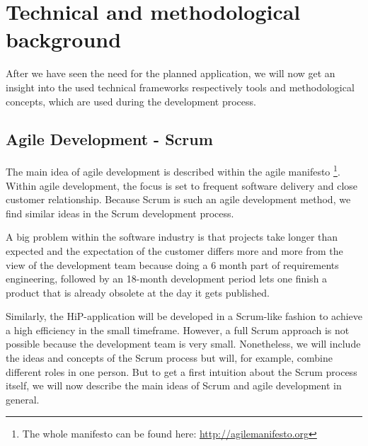 \chapter[Technical and methodological background]{Technical and methodological background}
\label{background}
After we have seen the need for the planned application, we will now get an insight into the used technical frameworks respectively tools and methodological concepts, which are used during the development process.  

\section{Agile Development - Scrum}
\label{SCRUM-intro}
The main idea of agile development is described within the agile manifesto \cite{Beck2001agile}\footnote{The whole manifesto can be found here: \url{http://agilemanifesto.org}}. Within agile development, the focus is set to frequent software delivery and close customer relationship. Because Scrum is such an agile development method, we find similar ideas in the Scrum development process.

A big problem within the software industry is that projects take longer than expected and the expectation of the customer differs more and more from the view of the development team because doing a 6 month part of requirements engineering, followed by an 18-month development period lets one finish a product that is already obsolete at the day it gets published.

Similarly, the HiP-application will be developed in a Scrum-like fashion to achieve a high efficiency in the small timeframe. However, a full Scrum approach is not possible because the development team is very small. Nonetheless, we will include the ideas and concepts of the Scrum process but will, for example, combine different roles in one person. But to get a first intuition about the Scrum process itself, we will now describe the main ideas of Scrum and agile development in general.

